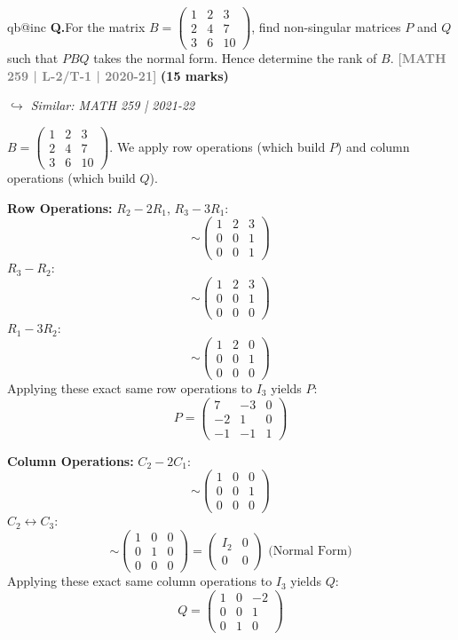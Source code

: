 \documentclass[12pt,a3paper]{article}
\makeatletter
\newcommand{\yr}[1]{\hfill\textcolor{gray}{\small\textbf{[#1]}}}
\newcommand{\mk}[1]{\textcolor{orange!70!black}{\small\textbf{(#1 marks)}}}
\newcommand{\variant}[1]{\par\vspace{1pt}\textcolor{blue!50!black}%
  {\footnotesize\textit{$\hookrightarrow$ Similar: #1}}}
\newcounter{qnum}
\newcommand{\Q}[1]{%
  \csname qb@inc\endcsname
  \needspace{4\baselineskip}
  \refstepcounter{qnum}
  \vspace{6pt}
  \noindent\textbf{Q\theqnum.}\enspace #1\par
}
\makeatother
\begin{document}
\Q{For the matrix $B = \begin{pmatrix} 1 & 2 & 3 \\ 2 & 4 & 7 \\ 3 & 6 & 10 \end{pmatrix}$, find non-singular matrices $P$ and $Q$ such that $PBQ$ takes the normal form. Hence determine the rank of $B$.
\yr{MATH 259 | L-2/T-1 | 2020-21} \mk{15}
\variant{MATH 259 | 2021-22}}
\begin{tcolorbox}[enhanced,breakable,
  colback=cB!4,colframe=cB,boxrule=0.8pt,arc=5pt,
  title={\textbf{Answer --- Normal Form of $B$; Rank, $P$ and $Q$}},
  fonttitle=\bfseries\color{white},colbacktitle=cB]

$B = \begin{pmatrix}1&2&3\\2&4&7\\3&6&10\end{pmatrix}$. We apply row operations (which build $P$) and column operations (which build $Q$).

\textbf{Row Operations:}
$R_2-2R_1$, $R_3-3R_1$:
\[
\sim \begin{pmatrix}1&2&3\\0&0&1\\0&0&1\end{pmatrix}
\]
$R_3-R_2$:
\[
\sim \begin{pmatrix}1&2&3\\0&0&1\\0&0&0\end{pmatrix}
\]
$R_1-3R_2$:
\[
\sim \begin{pmatrix}1&2&0\\0&0&1\\0&0&0\end{pmatrix}
\]
Applying these exact same row operations to $I_3$ yields $P$:
\[
P = \begin{pmatrix}7&-3&0\\-2&1&0\\-1&-1&1\end{pmatrix}
\]

\textbf{Column Operations:}
$C_2-2C_1$:
\[
\sim \begin{pmatrix}1&0&0\\0&0&1\\0&0&0\end{pmatrix}
\]
$C_2\leftrightarrow C_3$:
\[
\sim \begin{pmatrix}1&0&0\\0&1&0\\0&0&0\end{pmatrix} = \begin{pmatrix}I_2&0\\0&0\end{pmatrix} \text{ (Normal Form)}
\]
Applying these exact same column operations to $I_3$ yields $Q$:
\[
Q = \begin{pmatrix}1&0&-2\\0&0&1\\0&1&0\end{pmatrix}
\]


\end{tcolorbox}
\end{document}
